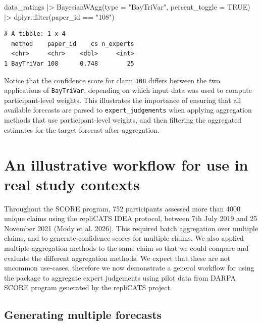 \documentclass[
  11pt,
  a4paper,
]{article}
\newenvironment{Shaded}{\begin{snugshade}}{\end{snugshade}}
\newcommand{\AttributeTok}[1]{\textcolor[rgb]{0.40,0.45,0.13}{#1}}
\newcommand{\ConstantTok}[1]{\textcolor[rgb]{0.56,0.35,0.01}{#1}}
\newcommand{\FunctionTok}[1]{\textcolor[rgb]{0.28,0.35,0.67}{#1}}
\newcommand{\NormalTok}[1]{\textcolor[rgb]{0.00,0.23,0.31}{#1}}
\newcommand{\SpecialCharTok}[1]{\textcolor[rgb]{0.37,0.37,0.37}{#1}}
\newcommand{\StringTok}[1]{\textcolor[rgb]{0.13,0.47,0.30}{#1}}
\begin{document}
\begin{Shaded}
\begin{Highlighting}[]
\NormalTok{data\_ratings }\SpecialCharTok{|\textgreater{}}
  \FunctionTok{BayesianWAgg}\NormalTok{(}\AttributeTok{type =} \StringTok{"BayTriVar"}\NormalTok{, }\AttributeTok{percent\_toggle =} \ConstantTok{TRUE}\NormalTok{) }\SpecialCharTok{|\textgreater{}}
\NormalTok{  dplyr}\SpecialCharTok{::}\FunctionTok{filter}\NormalTok{(paper\_id }\SpecialCharTok{==} \StringTok{"108"}\NormalTok{)}
\end{Highlighting}
\end{Shaded}

\begin{verbatim}
# A tibble: 1 x 4
  method    paper_id    cs n_experts
  <chr>     <chr>    <dbl>     <int>
1 BayTriVar 108      0.748        25
\end{verbatim}

Notice that the confidence score for claim \texttt{108} differs between
the two applications of \texttt{BayTriVar}, depending on which input
data was used to compute participant-level weights. This illustrates the
importance of ensuring that all available forecasts are parsed to
\texttt{expert\_judgements} when applying aggregation methods that use
participant-level weights, and then filtering the aggregated estimates
for the target forecast after aggregation.

\section{An illustrative workflow for use in real study
contexts}\label{sec-workflow}

Throughout the SCORE program, 752 participants assessed more than 4000
unique claims using the repliCATS IDEA protocol, between 7th July 2019
and 25 November 2021 (Mody et al. 2026). This required batch aggregation
over multiple claims, and to generate confidence scores for multiple
claims. We also applied multiple aggregation methods to the same claim
so that we could compare and evaluate the different aggregation methods.
We expect that these are not uncommon use-cases, therefore we now
demonstrate a general workflow for using the  package to
aggregate expert judgements using pilot data from DARPA SCORE program
generated by the repliCATS project.

\subsection{Generating multiple
forecasts}\label{generating-multiple-forecasts}
\end{document}
